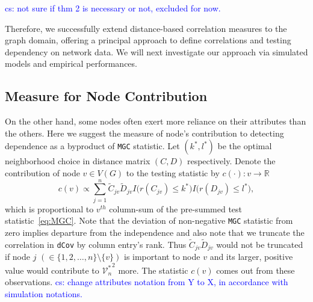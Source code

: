 \documentclass[11pt]{article}
\theoremstyle{definition}
\newcommand{\cs}[1]{\textcolor{blue}{cs: #1}}
\begin{document}

\cs{not sure if thm 2 is necessary or not, excluded for now.}


Therefore, we successfully extend distance-based correlation measures to the graph domain, offering a principal approach to define correlations and testing dependency on network data. We will next investigate our approach via simulated models and empirical performances.

\subsection{Measure for Node Contribution}
On the other hand, some nodes often exert more reliance on their attributes than the others. Here we suggest the measure of node's contribution to detecting dependence as a byproduct of \texttt{MGC} statistic. Let $(k^{*}, l^{*})$ be the optimal neighborhood choice in distance matrix $(C, D)$ respectively. Denote the contribution of node $v \in V(G)$ to the testing statistic by  $c(\cdot) : v \rightarrow \mathbb{R}$
\begin{equation}
\label{eq:contribution}
c(v) \propto \sum\limits_{j=1}^{n} \tilde{C}_{j v} \tilde{D}_{j v} I \big(  r (C_{j v}) \leq k^{*}  \big) I \big( r (D_{ j v }) \leq l^{*} \big), 
\end{equation}
which is proportional to $v^{th}$ column-sum of the pre-summed test statistic~\ref{eq:MGC}. Note that the deviation of non-negative \texttt{MGC} statistic from zero implies departure from the independence and also note that we truncate the correlation in \texttt{dCov} by column entry's rank. Thus $\tilde{C}_{jv} \tilde{D}_{jv}$ would not be truncated if node $j$ $(\in \{ 1,2, \ldots, n \} \setminus \{v \} )$ is important to node $v$ and its larger, positive value would contribute to ${\mathcal{V}^{*}_{n}}^2$ more. The statistic $c(v)$ comes out from these observations. 
\cs{change attributes notation from Y to X, in accordance with simulation notations. }

\end{document}
